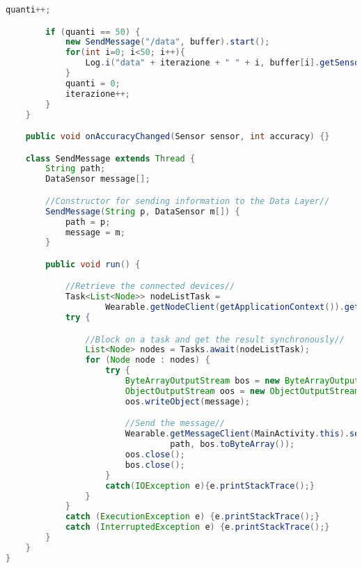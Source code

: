 \begin{lstlisting}[language=Java,  basicstyle=\footnotesize]
        quanti++;

        if (quanti == 50) {
            new SendMessage("/data", buffer).start();
            for(int i=0; i<50; i++){
                Log.i("data" + iterazione + " " + i, buffer[i].getSensorType()+" ");
            }
            quanti = 0;
            iterazione++;
        }
    }

    public void onAccuracyChanged(Sensor sensor, int accuracy) {}

    class SendMessage extends Thread {
        String path;
        DataSensor message[];

        //Constructor for sending information to the Data Layer//
        SendMessage(String p, DataSensor m[]) {
            path = p;
            message = m;
        }

        public void run() {

            //Retrieve the connected devices//
            Task<List<Node>> nodeListTask =
                    Wearable.getNodeClient(getApplicationContext()).getConnectedNodes();
            try {

                //Block on a task and get the result synchronously//
                List<Node> nodes = Tasks.await(nodeListTask);
                for (Node node : nodes) {
                    try {
                        ByteArrayOutputStream bos = new ByteArrayOutputStream();
                        ObjectOutputStream oos = new ObjectOutputStream(bos);
                        oos.writeObject(message);

                        //Send the message//
                        Wearable.getMessageClient(MainActivity.this).sendMessage(node.getId(),
								 path, bos.toByteArray());
                        oos.close();
                        bos.close();
                    }
                    catch(IOException e){e.printStackTrace();}
                }
            }
            catch (ExecutionException e) {e.printStackTrace();}
            catch (InterruptedException e) {e.printStackTrace();}
        }
    }
}
\end{lstlisting}